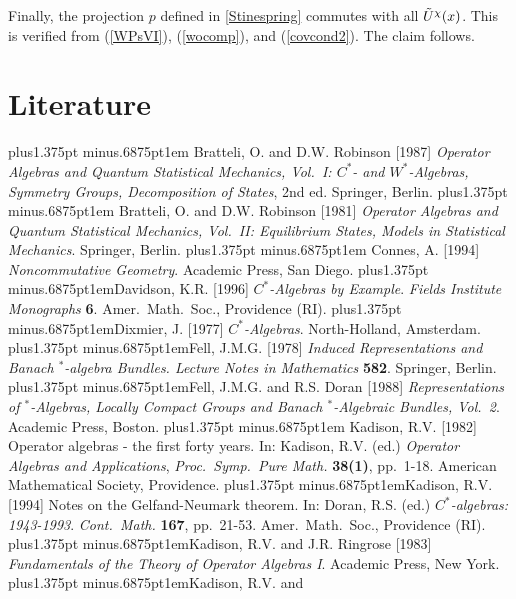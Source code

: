 Finally, the projection $p$ defined in \ref{Stinespring} commutes
with all $\tilde{U}^{\chi}(x)$.  This is verified from (\ref{WPsVI}),
(\ref{wocomp}), and (\ref{covcond2}).  The claim follows.\enp 
 \section*{Literature}
\thispagestyle{myheadings}
\begingroup
\def\item{\vskip2.75pt plus1.375pt minus.6875pt\noindent\hangindent1em}
 
\item 
 Bratteli, O. and D.W. Robinson [1987] {\em Operator
Algebras and Quantum Statistical Mechanics, Vol.\ I: $C^*$- and $W^*$-Algebras, Symmetry Groups,
Decomposition of States}, 2nd ed. Springer, Berlin.\item 
  Bratteli, O. and D.W. Robinson [1981] {\em Operator Algebras and Quantum Statistical Mechanics,
Vol.\ II: Equilibrium States, Models in Statistical Mechanics}. Springer, Berlin.\item 
Connes, A. [1994] {\em Noncommutative Geometry}. Academic Press, San
Diego.\item Davidson, K.R. [1996] {\em $C^*$-Algebras by
Example}. {\em Fields Institute Monographs} {\bf 6}.  Amer.\ Math.\
Soc., Providence (RI).\item Dixmier, J. [1977] {\em
$C^*$-Algebras}. North-Holland, Amsterdam.\item Fell, J.M.G. [1978]
{\em Induced Representations and Banach $\mbox{}^*$-algebra
Bundles. Lecture Notes in Mathematics} {\bf 582}. Springer,
Berlin.\item Fell, J.M.G.  and R.S. Doran [1988] {\em Representations
of $\mbox{}^*$-Algebras, Locally Compact Groups and Banach
$\mbox{}^*$-Algebraic Bundles, Vol.\ 2}. Academic Press, Boston.\item
Kadison, R.V. [1982] Operator algebras - the first forty years.  In:
Kadison, R.V. (ed.) {\em Operator Algebras and Applications}, {\em
Proc.\ Symp.\ Pure Math.} {\bf 38(1)}, pp.\ 1-18.  American
Mathematical Society, Providence.\item Kadison, R.V. [1994] Notes on
the Gelfand-Neumark theorem. In: Doran, R.S. (ed.) {\em
$C^*$-algebras: 1943-1993}. {\em Cont.\ Math.} {\bf 167}, pp.\
21-53. Amer.\ Math.\ Soc., Providence (RI).\item Kadison, R.V. and
J.R. Ringrose [1983] {\em Fundamentals of the Theory of Operator
Algebras I}.  Academic Press, New York.\item Kadison, R.V. and
